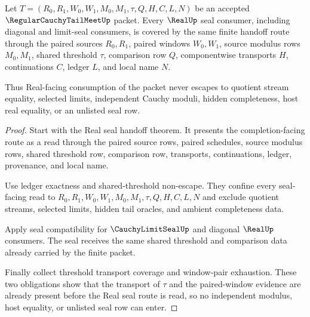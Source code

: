 \begin{theorem}
\label{thm:regular-cauchy-tail-meet-real-seal-consumer-coverage}
Let $T=(R_0,R_1,W_0,W_1,M_0,M_1,\tau,Q,H,C,L,N)$ be an accepted $\RegularCauchyTailMeetUp$ packet. Every $\RealUp$ seal consumer, including diagonal and limit-seal consumers, is covered by the same finite handoff route through the paired sources $R_0,R_1$, paired windows $W_0,W_1$, source modulus rows $M_0,M_1$, shared threshold $\tau$, comparison row $Q$, componentwise transports $H$, continuations $C$, ledger $L$, and local name $N$.

Thus Real-facing consumption of the packet never escapes to quotient stream equality, selected limits, independent Cauchy moduli, hidden completeness, host real equality, or an unlisted seal row.
\end{theorem}
\begin{proof}
Start with the Real seal handoff theorem. It presents the completion-facing route as a read through the paired source rows, paired schedules, source modulus rows, shared threshold row, comparison row, transports, continuations, ledger, provenance, and local name.

Use ledger exactness and shared-threshold non-escape. They confine every seal-facing read to $R_0,R_1,W_0,W_1,M_0,M_1,\tau,Q,H,C,L,N$ and exclude quotient streams, selected limits, hidden tail oracles, and ambient completeness data.

Apply seal compatibility for $\CauchyLimitSealUp$ and diagonal $\RealUp$ consumers. The seal receives the same shared threshold and comparison data already carried by the finite packet.

Finally collect threshold transport coverage and window-pair exhaustion. These two obligations show that the transport of $\tau$ and the paired-window evidence are already present before the Real seal route is read, so no independent modulus, host equality, or unlisted seal row can enter.
\end{proof}

